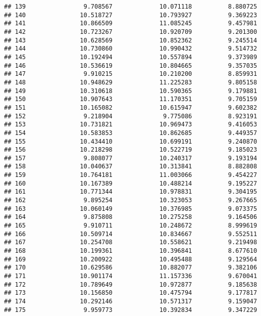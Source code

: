 \documentclass[
]{article}
\begin{document}
\begin{verbatim}
## 139                9.708567             10.071118          8.880725
## 140               10.518727             10.793927          9.369223
## 141               10.866509             11.085245          9.457981
## 142               10.723267             10.920709          9.201300
## 143               10.628569             10.852362          9.245514
## 144               10.730860             10.990432          9.514732
## 145               10.192494             10.557894          9.373989
## 146               10.536619             10.804665          9.357035
## 147                9.910215             10.210200          8.859931
## 148               10.948629             11.225283          9.805158
## 149               10.310618             10.590365          9.179881
## 150               10.907643             11.170351          9.705159
## 151               10.165082             10.615947          9.602382
## 152                9.218904              9.775086          8.923191
## 153               10.731821             10.969473          9.416053
## 154               10.583853             10.862685          9.449357
## 155               10.434410             10.699191          9.240870
## 156               10.218298             10.522719          9.185023
## 157                9.808077             10.240317          9.193194
## 158               10.040637             10.313841          8.882808
## 159               10.764181             11.003066          9.454227
## 160               10.167389             10.488214          9.195227
## 161               10.771344             10.978831          9.304195
## 162                9.895254             10.323053          9.267665
## 163               10.060149             10.376985          9.073375
## 164                9.875808             10.275258          9.164506
## 165                9.910711             10.248672          8.999619
## 166               10.509714             10.834667          9.552511
## 167               10.254708             10.558621          9.219498
## 168               10.199361             10.396841          8.677610
## 169               10.200922             10.495488          9.129564
## 170               10.629586             10.882077          9.382106
## 171               10.901174             11.157336          9.670041
## 172               10.789649             10.972877          9.185638
## 173               10.156850             10.475794          9.177817
## 174               10.292146             10.571317          9.159047
## 175                9.959773             10.392834          9.347229

\end{verbatim}
\end{document}
